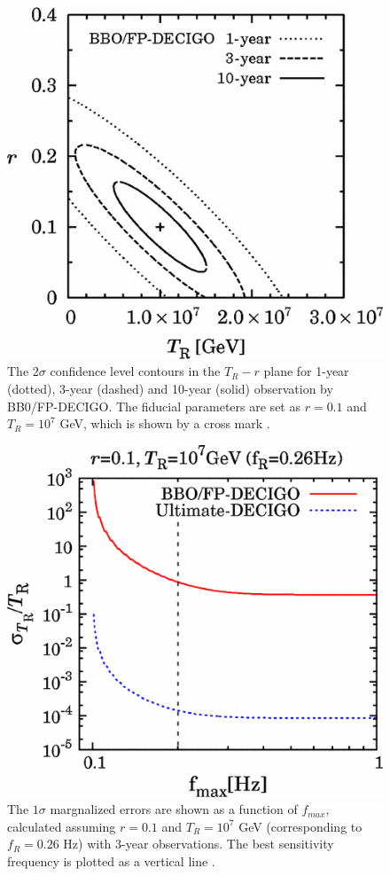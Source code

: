 \documentclass[11pt,a4paper,twoside]{book}
\begin{document}
\begin{figure}
	\centering
	\includegraphics[width=0.7\linewidth, height=0.3\textheight]{Images/Chap3/Kurojanagi_Nakayama_Fig2}
	\caption{The $ 2\sigma $ confidence level contours in the $ T_{R}-r $ plane for 1-year (dotted), 3-year (dashed) and 10-year (solid) observation by BB0/FP-DECIGO. The fiducial parameters are set as $r=0.1$ and $ T_{R}=10^{7} $ GeV, which is shown by a cross mark \cite{Chap3:ProspectsForDeterminationWithDetectors}. }
	\label{fig:kurojanaginakayamafig2}
\end{figure}
\begin{figure}
	\centering
	\includegraphics[width=0.7\linewidth, height=0.3\textheight]{Images/Chap3/Kurojanagi_Nakayama_Fig3}
	\caption{The $ 1\sigma $ margnalized errors are shown as a function of $ f_{max} $, calculated assuming $ r=0.1 $ and $ T_{R}=10^{7} $ GeV (corresponding to $ f_{R}=0.26 $ Hz) with 3-year observations. The best sensitivity frequency is plotted as a vertical line \cite{Chap3:ProspectsForDeterminationWithDetectors}.}
	\label{fig:kurojanaginakayamafig3}
\end{figure}
\end{document}
